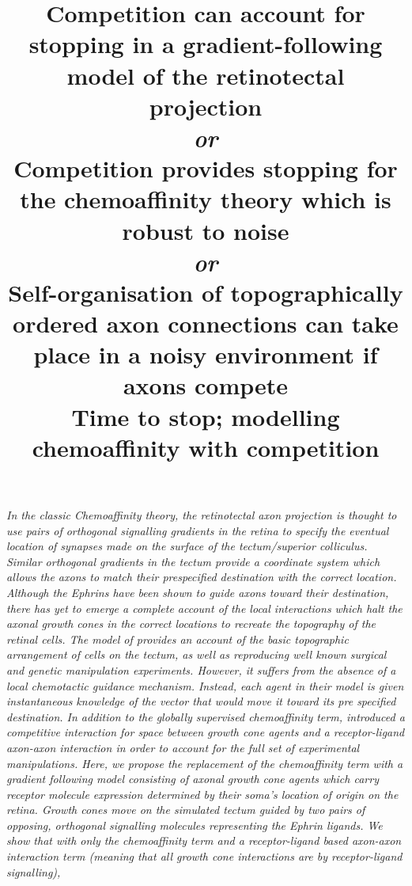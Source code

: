 \documentclass[11pt, a4paper]{article}
\title {
  Competition can account for stopping in a gradient-following model
  of the retinotectal projection \\
  \emph{or} \\
  Competition provides stopping for the chemoaffinity
  theory which is robust to noise \\
  \emph{or} \\
  Self-organisation of topographically ordered axon connections can take place
  in a noisy environment if axons compete \\
  Time to stop; modelling chemoaffinity with competition \\
}
\date{} %
\author{\Authors}
\begin{document}
\setlength{\droptitle}{-1.8cm} %
\maketitle

\vspace{-1.8cm} %

\emph{In the classic Chemoaffinity theory, the retinotectal axon projection is
thought to use pairs of orthogonal signalling gradients in the retina to
specify the eventual location of synapses made on the surface of the
tectum/superior colliculus. Similar orthogonal gradients in the tectum provide
a coordinate system which allows the axons to match their prespecified
destination with the correct location. Although the Ephrins have been shown to
guide axons toward their destination, there has yet to emerge a complete
account of the local interactions which halt the axonal growth cones in the
correct locations to recreate the topography of the retinal cells. The model
of \citet{simpson_simple_2011} provides an account of the basic topographic
arrangement of cells on the tectum, as well as reproducing well known surgical
and genetic manipulation experiments. However, it suffers from the absence of
a local chemotactic guidance mechanism. Instead, each agent in their model is
given instantaneous knowledge of the vector that would move it toward its pre
specified destination. In addition to the globally supervised chemoaffinity
term, \citet{simpson_simple_2011} introduced a competitive interaction for
space between growth cone agents and a receptor-ligand axon-axon interaction
in order to account for the full set of experimental manipulations. Here, we
propose the replacement of the chemoaffinity term with a gradient following
model consisting of axonal growth cone agents which carry receptor molecule
expression determined by their soma's location of origin on the retina. Growth
cones move on the simulated tectum guided by two pairs of opposing, orthogonal
signalling molecules representing the Ephrin ligands. We show that with only
the chemoaffinity term and a receptor-ligand based axon-axon interaction term
(meaning that all growth cone interactions are by receptor-ligand signalling),
}
\end{document}

